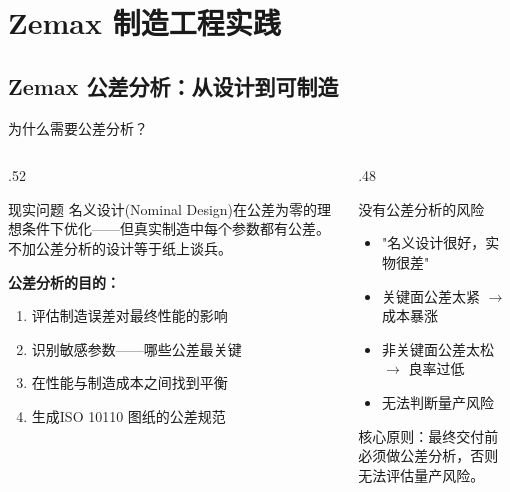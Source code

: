 \section{Zemax 制造工程实践}

\subsection{Zemax 公差分析：从设计到可制造}

\begin{frame}{为什么需要公差分析？}
    \begin{columns}[T]
        \begin{column}{.52\textwidth}
            \begin{block}{现实问题}
                \alert{名义设计}(Nominal Design)在公差为零的理想条件下优化——但真实制造中每个参数都有公差。不加公差分析的设计等于\alert{纸上谈兵}。
            \end{block}

            \bigbreak
            \textbf{公差分析的目的：}
            \begin{enumerate}
                \item 评估制造误差对\alert{最终性能}的影响
                \item 识别\alert{敏感参数}——哪些公差最关键
                \item 在性能与\alert{制造成本}之间找到平衡
                \item 生成\alert{ISO 10110} 图纸的公差规范
            \end{enumerate}
        \end{column}
        \hfill
        \begin{column}{.48\textwidth}
            \begin{block}{没有公差分析的风险}
                \begin{itemize}
                    \item "名义设计很好，实物很差"
                    \item 关键面公差太紧 $\rightarrow$ 成本暴涨
                    \item 非关键面公差太松 $\rightarrow$ 良率过低
                    \item 无法判断量产风险
                \end{itemize}
            \end{block}

            \bigbreak
            \alert{核心原则：}最终交付前必须做公差分析，否则无法评估量产风险。
        \end{column}
    \end{columns}
\end{frame}

